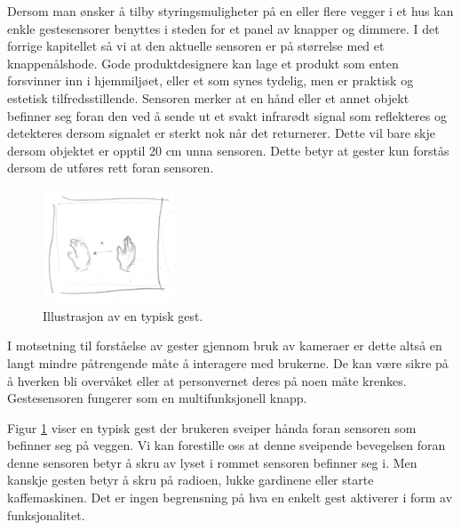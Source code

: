 Dersom man ønsker å tilby styringsmuligheter på en eller flere vegger i et hus kan enkle gestesensorer benyttes i steden for et panel av knapper og dimmere. I det forrige kapitellet så vi at den aktuelle sensoren er på størrelse med et knappenålshode. Gode produktdesignere kan lage et produkt som enten forsvinner inn i hjemmiljøet, eller et som synes tydelig, men er praktisk og estetisk tilfredsstillende. Sensoren merker at en hånd eller et annet objekt befinner seg foran den ved å sende ut et svakt infrarødt signal som reflekteres og detekteres dersom signalet er sterkt nok når det returnerer. Dette vil bare skje dersom objektet er opptil 20 cm unna sensoren. Dette betyr at gester kun forstås dersom de utføres rett foran sensoren.
\begin{figure}
    \vspace{-20pt}
  \begin{center}
    \includegraphics[width=0.35\textwidth]{fig/swipe-l-r}
  \end{center}
  \vspace{-20pt}
  \caption{Illustrasjon av en typisk gest.}
  \label{fig:gest}
  \vspace{-7pt}
\end{figure}
I motsetning til forståelse av gester gjennom bruk av kameraer er dette altså en langt mindre påtrengende måte å interagere med brukerne. De kan være sikre på å hverken bli overvåket eller at personvernet deres på noen måte krenkes. Gestesensoren fungerer som en multifunksjonell knapp.

Figur \ref{fig:gest} viser en typisk gest der brukeren sveiper hånda foran sensoren som befinner seg på veggen. Vi kan forestille oss at denne sveipende bevegelsen foran denne sensoren betyr å skru av lyset i rommet sensoren befinner seg i. Men kanskje gesten betyr å skru på radioen, lukke gardinene eller starte kaffemaskinen. Det er ingen begrensning på hva en enkelt gest aktiverer i form av funksjonalitet.

